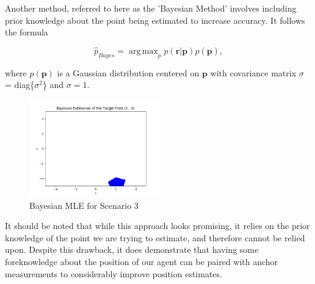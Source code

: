 \documentclass[a4paper]{article}
\DeclareMathOperator*{\argmax}{arg\,max}
\begin{document}
Another method, referred to here as the 'Bayesian Method' involves including prior knowledge about the point being estimated to increase accuracy.  It follows the formula

\[
\hat{p}_{Bayes} = \argmax _p p(\bm{r}|\bm{p}) p(\bm{p}) , 
\]

where $p(\bm{p})$ is a Gaussian distribution centered on $\bm{p}$ with covariance matrix $\sigma$ = diag\{$\sigma ^2$\} and $\sigma = 1$.

\begin{figure}[h]
	\begin{center}
		\includegraphics[width=0.5\textwidth]{bayesian_mle.png}
		\caption{Bayesian MLE for Scenario 3}
	\end{center}
\end{figure}

It should be noted that while this approach looks promising, it relies on the prior knowledge of the point we are trying to estimate, and therefore cannot be relied upon.  Despite this drawback, it does demonstrate that having some foreknowledge about the position of our agent can be paired with anchor measurements to considerably improve position estimates.
\end{document}
